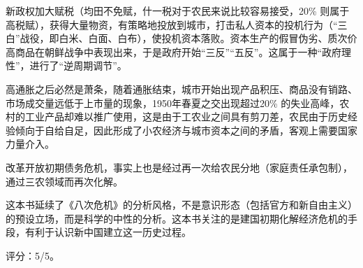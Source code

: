 \begin{itemize*}
    \item 新政权加大赋税（均田不免赋，什一税对于农民来说比较容易接受，20\% 则属于高税赋），获得大量物资，有策略地投放到城市，打击私人资本的投机行为（“三白”战役，即白米、白面、白布），使投机资本落败。资本生产的假冒伪劣、质次价高商品在朝鲜战争中表现出来，于是政府开始“三反”“五反”。这属于一种“政府理性”，进行了“逆周期调节”。
    \item 高通胀之后必然是萧条，随着通胀结束，城市开始出现产品积压、商品没有销路、市场成交量远低于上市量的现象，1950年春夏之交出现超过20\% 的失业高峰，农村的工业产品却难以推广使用，这是由于工农业之间具有剪刀差，农民由于历史经验倾向于自给自足，因此形成了小农经济与城市资本之间的矛盾，客观上需要国家力量介入。
    \item 改革开放初期债务危机，事实上也是经过再一次给农民分地（家庭责任承包制），通过三农领域而再次化解。
\end{itemize*}

这本书延续了《八次危机》的分析风格，不是意识形态（包括官方和新自由主义）的预设立场，而是科学的中性的分析。这本书关注的是建国初期化解经济危机的手段，有利于认识新中国建立这一历史过程。

评分：5/5。